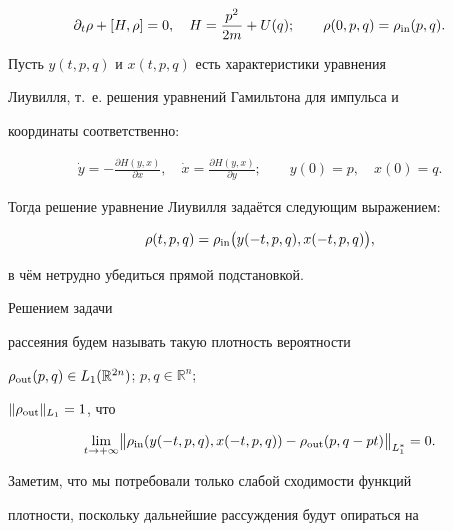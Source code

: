 \begin{gather}

\partial_t \rho + [H,\rho]=0,

\quad 

H=\frac{p^2}{2m}+U(q);

\qquad 

\rho(0,p,q)=\rho_{\rm in}(p,q).

\end{gather}

 Пусть $y(t,p,q)$ и $x(t,p,q)$ есть характеристики уравнения

 Лиувилля, т.~е. решения уравнений Гамильтона для импульса и

 координаты соответственно:

\begin{gather}

\dot{y}=-\frac{\partial H(y,x)}{\partial x},

\quad 

\dot{x}=\frac{\partial H(y,x)}{\partial y};

\qquad 

y(0)= p, \quad  x(0)=q.

\end{gather}

 Тогда решение уравнение Лиувилля задаётся следующим выражением:

$$

\rho(t,p,q) =\rho_{\rm in}\bigl(y(-t,p,q),x(-t,p,q)\bigr),

$$

в чём нетрудно убедиться прямой подстановкой. 

Решением задачи

рассеяния будем называть такую плотность вероятности

$\rho_{\rm out}(p,q)\in L_1(\mathbb{R}^{2n})$; $p, q \in \mathbb{R}^{n}$;

$\|\rho_{\rm out}\|_{L_1}=1$, что

\begin{equation}

\lim_{t\rightarrow +\infty} \bigl\|\rho_{\rm in}(y(-t,p,q),x(-t,p,q))

-\rho_{\rm out}(p, q-pt) \bigr \|_{L^{\ast}_1}=0.

\end{equation}

Заметим, что мы потребовали только слабой сходимости функций

плотности, поскольку дальнейшие рассуждения будут опираться на

